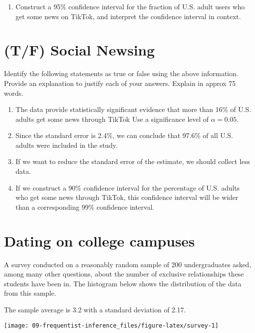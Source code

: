 \documentclass[
]{article}
\providecommand{\tightlist}{%
  \setlength{\itemsep}{0pt}\setlength{\parskip}{0pt}}
\begin{document}
\begin{enumerate}
\def\labelenumi{\alph{enumi}.}
\tightlist
\item
  Construct a 95\% confidence interval for the fraction of U.S. adult
  users who get some news on TikTok, and interpret the confidence
  interval in context.
\end{enumerate}

\section{(T/F) Social Newsing}\label{tf-social-newsing}

Identify the following statements as true or false using the above
information. Provide an explanation to justify each of your answers.
Explain in approx 75 words.

\begin{enumerate}
\def\labelenumi{\alph{enumi}.}
\item
  The data provide statistically significant evidence that more than
  16\% of U.S. adults get some news through TikTok Use a significance
  level of \(\alpha = 0.05\).
\item
  Since the standard error is 2.4\%, we can conclude that 97.6\% of all
  U.S. adults were included in the study.
\item
  If we want to reduce the standard error of the estimate, we should
  collect less data.
\item
  If we construct a 90\% confidence interval for the percentage of U.S.
  adults who get some news through TikTok, this confidence interval will
  be wider than a corresponding 99\% confidence interval.
\end{enumerate}

\section{Dating on college campuses}\label{dating-on-college-campuses}

A survey conducted on a reasonably random sample of 200 undergraduates
asked, among many other questions, about the number of exclusive
relationships these students have been in. The histogram below shows the
distribution of the data from this sample.

The sample average is 3.2 with a standard deviation of 2.17.

\begin{center}\texttt{[image: 09-frequentist-inference\_files/figure-latex/survey-1]} \end{center}
\end{document}
